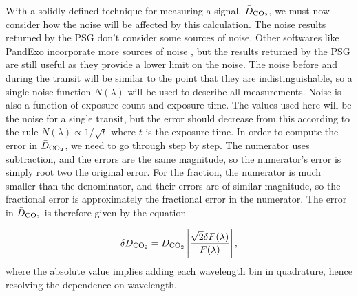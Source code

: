 With a solidly defined technique for measuring a signal, $\bar{D}_{\mathrm{CO_2}}$,
 we must now consider how the noise will be affected by this calculation. The
 noise results returned by the PSG don't consider some sources of noise. Other
 softwares like PandExo incorporate more sources of noise \citep{batalha17}, but
 the results returned by the PSG are still useful as they provide a lower limit
 on the noise. The noise before and during the transit will be similar to the
 point that they are indistinguishable, so a single noise function $N(\lambda)$
 will be used to describe all measurements. Noise is also a function of exposure
 count and exposure time. The values used here will be the noise for a single
 transit, but the error should decrease from this according to the rule
 $N(\lambda)\propto 1/\sqrt{t}$ where $t$ is the exposure time. In order to
 compute the error in $\bar{D}_{\mathrm{CO_2}}$, we need to go through step by step.
 The numerator uses subtraction, and the errors are the same magnitude, so the
 numerator's
 error is simply root two the original error. For the fraction, the numerator is
 much smaller than the denominator, and their errors are of similar magnitude,
 so the
 fractional error is approximately the fractional error in the numerator. The
 error in $\bar{D}_{\mathrm{CO_2}}$ is therefore given by the equation

\begin{equation}
    \delta\bar{D}_{\mathrm{CO_2}}
    =\bar{D}_{\mathrm{CO_2}}\left|\frac{\sqrt{2}\delta F(\lambda)}{F(\lambda)}\right|,
\end{equation}
where the absolute value implies adding each wavelength bin in quadrature, hence
 resolving the dependence on wavelength.

